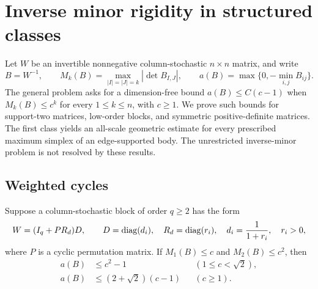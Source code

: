 \section{Inverse minor rigidity in structured classes}
\label{sec:inverse}

Let $W$ be an invertible nonnegative column-stochastic $n\times n$
matrix, and write
\[
 B=W^{-1},\qquad
 M_k(B)=\max_{|I|=|J|=k}|\det B_{I,J}|,\qquad
 a(B)=\max\{0,-\min_{i,j}B_{ij}\}.
\]
The general problem asks for a dimension-free bound
$a(B)\leq C(c-1)$ when $M_k(B)\leq c^k$ for every $1\leq k\leq n$,
with $c\geq1$.  We prove such bounds for support-two matrices,
low-order blocks, and symmetric positive-definite matrices.  The
first class yields an all-scale geometric estimate for every
prescribed maximum simplex of an edge-supported body.  The
unrestricted inverse-minor problem is not resolved by these results.

\subsection{Weighted cycles}

\begin{lemma}
\label{lem:inverse-cycles}
Suppose a column-stochastic block of order $q\geq2$ has the form
\[
 W=(I_q+P R_d)D,\qquad
 D=\operatorname{diag}(d_i),\quad R_d=\operatorname{diag}(r_i),\quad
 d_i=\frac1{1+r_i},\quad r_i>0,
\]
where $P$ is a cyclic permutation matrix.  If
$M_1(B)\leq c$ and $M_2(B)\leq c^2$, then
\begin{align}
 a(B)&\leq c^2-1 &&(1\leq c<\sqrt2),\label{eq:inverse-cycle-local}\\
 a(B)&\leq(2+\sqrt2)(c-1)&&(c\geq1).
 \label{eq:inverse-cycle-global}
\end{align}
\end{lemma}

